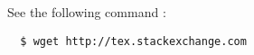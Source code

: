\documentclass{article}
\begin{document}
\noindent See the following command :
\begin{verbatim}
  $ wget http://tex.stackexchange.com
\end{verbatim}
\end{document}
